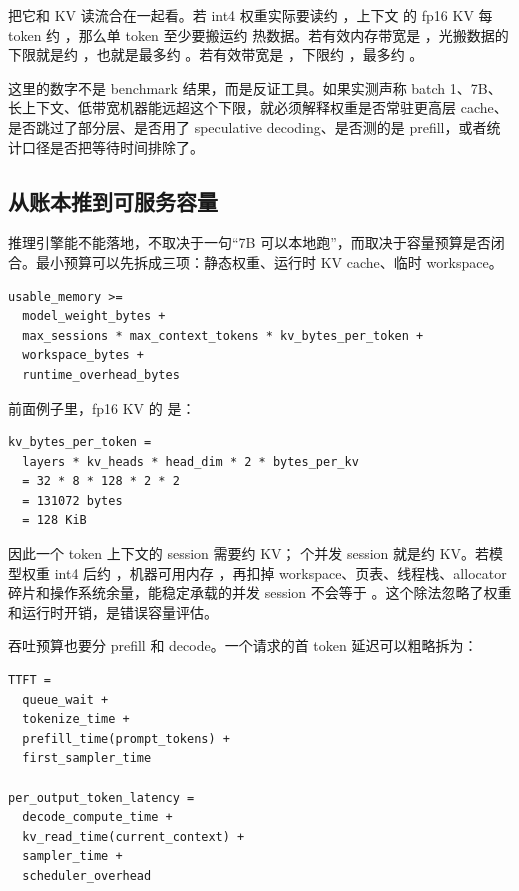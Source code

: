把它和 KV 读流合在一起看。若 int4 权重实际要读约 ，上下文  的 fp16 KV 每 token 约 ，那么单 token 至少要搬运约  热数据。若有效内存带宽是 ，光搬数据的下限就是约 ，也就是最多约 。若有效带宽是 ，下限约 ，最多约 。

\begin{warningbox}
这里的数字不是 benchmark 结果，而是反证工具。如果实测声称 batch 1、7B、长上下文、低带宽机器能远超这个下限，就必须解释权重是否常驻更高层 cache、是否跳过了部分层、是否用了 speculative decoding、是否测的是 prefill，或者统计口径是否把等待时间排除了。
\end{warningbox}

\subsection{从账本推到可服务容量}

推理引擎能不能落地，不取决于一句“7B 可以本地跑”，而取决于容量预算是否闭合。最小预算可以先拆成三项：静态权重、运行时 KV cache、临时 workspace。

\begin{lstlisting}[numbers=none,caption={单机推理服务的内存预算}]
usable_memory >=
  model_weight_bytes +
  max_sessions * max_context_tokens * kv_bytes_per_token +
  workspace_bytes +
  runtime_overhead_bytes
\end{lstlisting}

前面例子里，fp16 KV 的  是：

\begin{lstlisting}[numbers=none,caption={每个 session 每个 token 的 KV 容量}]
kv_bytes_per_token =
  layers * kv_heads * head_dim * 2 * bytes_per_kv
  = 32 * 8 * 128 * 2 * 2
  = 131072 bytes
  = 128 KiB
\end{lstlisting}

因此一个  token 上下文的 session 需要约  KV； 个并发 session 就是约  KV。若模型权重 int4 后约 ，机器可用内存 ，再扣掉 workspace、页表、线程栈、allocator 碎片和操作系统余量，能稳定承载的并发 session 不会等于 。这个除法忽略了权重和运行时开销，是错误容量评估。

吞吐预算也要分 prefill 和 decode。一个请求的首 token 延迟可以粗略拆为：

\begin{lstlisting}[numbers=none,caption={请求延迟拆分}]
TTFT =
  queue_wait +
  tokenize_time +
  prefill_time(prompt_tokens) +
  first_sampler_time

per_output_token_latency =
  decode_compute_time +
  kv_read_time(current_context) +
  sampler_time +
  scheduler_overhead
\end{lstlisting}

